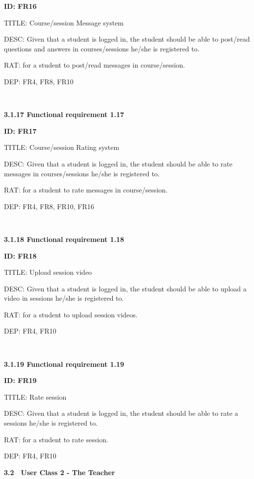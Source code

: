 \documentclass[12pt,a4paper]{article}
\begin{document}
\begin{flushleft}
        \textbf{ID: FR16}

        TITLE: Course/session Message system

        DESC: Given that a student is logged in, the student should be able to post/read questions and answers in courses/sessions he/she is registered to.

        RAT: for a student to post/read messages in course/session.

        DEP: FR4, FR8, FR10

        \

        \textbf{3.1.17 Functional requirement 1.17}

        \textbf{ID: FR17}

        TITLE: Course/session Rating system

        DESC: Given that a student is logged in, the student should be able to rate messages in courses/sessions he/she is registered to.

        RAT: for a student to rate messages in course/session.

        DEP: FR4, FR8, FR10, FR16

        \

        \textbf{3.1.18 Functional requirement 1.18}

        \textbf{ID: FR18}

        TITLE: Upload session video

        DESC: Given that a student is logged in, the student should be able to upload a video in sessions he/she is registered to.

        RAT: for a student to upload session videos.

        DEP: FR4, FR10

        \

        \textbf{3.1.19 Functional requirement 1.19}

        \textbf{ID: FR19}

        TITLE: Rate session

        DESC: Given that a student is logged in, the student should be able to rate a sessions he/she is registered to.

        RAT: for a student to rate session.

        DEP: FR4, FR10


        \newpage


        \textbf{3.2}\ \ \textbf{User Class 2 - The Teacher}

        \


\end{flushleft}
\end{document}

